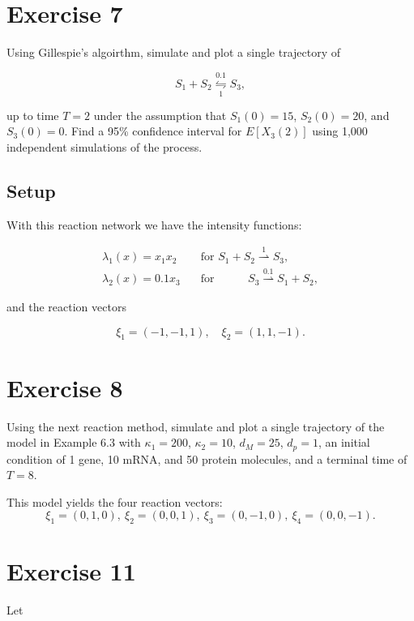 \section{Exercise 7}\label{exercise-7}

Using Gillespie's algoirthm, simulate and plot a single trajectory of

\[
  S_1 + S_2 \mathrel{\mathop{\leftrightharpoons}\limits_1^{0.1}} S_3,
\]

up to time \(T = 2\) under the assumption that \(S_1(0) = 15\),
\(S_2(0) = 20\), and \(S_3(0) = 0\). Find a 95\% confidence interval for
\(E[X_3(2)]\) using 1,000 independent simulations of the process.

\subsection{Setup}\label{setup}

With this reaction network we have the intensity functions:

\begin{align*}
  \lambda_1(x) = x_1x_2 & \quad \text{for $S_1 + S_2 \mathrel{\mathop{\rightharpoonup}\limits^1} S_3$}, \\
  \lambda_2(x) = 0.1x_3 & \quad \text{for $\phantom{S_1 +\ }\,S_3 \mathrel{\mathop{\rightharpoonup}\limits^{0.1}} S_1 + S_2$},
\end{align*}

and the reaction vectors

\[
  \xi_1 = (-1, -1, 1), \quad \xi_2 = (1, 1, -1).
\]

\section{Exercise 8}\label{exercise-8}

Using the next reaction method, simulate and plot a single trajectory of
the model in Example 6.3 with \(\kappa_1 = 200\), \(\kappa_2 = 10\),
\(d_M = 25\), \(d_p = 1\), an initial condition of 1 gene, 10 mRNA, and
50 protein molecules, and a terminal time of \(T = 8\).

This model yields the four reaction vectors: \[
\xi_1 = (0,1,0),\ \xi_2 = (0,0,1),\ \xi_3 = (0,-1,0),\ \xi_4 = (0,0,-1).
\]

\section{Exercise 11}\label{exercise-11}

Let

